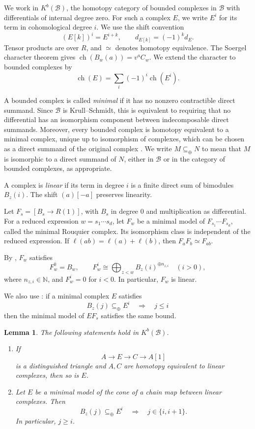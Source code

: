 \documentclass[11pt,a4paper]{article}
\numberwithin{equation}{section}
\newtheorem{lemma}[theorem]{Lemma}
\theoremstyle{remark}
\newcommand{\B}{\mathcal B}
\newcommand{\ch}{\operatorname{ch}}
\newcommand{\summand}{\mathrel{\subseteq_{\oplus}}}
\begin{document}
We work in \(K^b(\mathcal B)\), the homotopy category of bounded complexes in \(\mathcal B\) with differentials of internal degree zero. For such a complex \(E\), we write \(E^i\) for its term in cohomological degree \(i\). We use the shift convention
\[
(E[k])^i=E^{i+k},\qquad d_{E[k]}=(-1)^k d_E.
\]
Tensor products are over $R$, and $\simeq$ denotes homotopy equivalence.
The Soergel character theorem \cite[Theorem 1.1]{EW} gives
$\ch(B_w(a))=v^aC_w$. We extend the character to bounded complexes by
\[
\operatorname{ch}(E)=\sum_i(-1)^i\operatorname{ch}(E^i).
\]

A bounded complex is called \textit{minimal} if it has no nonzero contractible direct summand. Since \(\mathcal B\) is Krull–Schmidt, this is equivalent to requiring that no differential has an isomorphism component between indecomposable direct summands. Moreover, every bounded complex is homotopy equivalent to a minimal complex, unique up to
isomorphism of complexes, which can be chosen as a direct summand of
the original complex \cite[\S6.1]{EW}. We write \(M\summand N\) to mean that \(M\) is isomorphic to a direct summand of \(N\), either in \(\mathcal B\) or in the category of bounded complexes, as appropriate.

A complex is \emph{linear} if its term in degree $i$ is a finite direct
sum of bimodules $B_z(i)$. The shift $(a)[-a]$ preserves linearity.

Let $F_s=[B_s\to R(1)]$, with $B_s$ in degree $0$ and multiplication
as differential. For a reduced expression $w=s_1\cdots s_d$, let
$F_w$ be a minimal model of $F_{s_1}\cdots F_{s_d}$, called the minimal Rouquier complex. Its isomorphism
class is independent of the reduced expression. If
$\ell(ab)=\ell(a)+\ell(b)$, then $F_aF_b\simeq F_{ab}$.


By \cite[Theorem 6.9]{EW}, \(F_w\) satisfies
\[
F_w^0=B_w,\qquad
F_w^i\cong\bigoplus_{z<w}B_z(i)^{\oplus n_{z,i}}
\quad(i>0),
\]
where \(n_{z,i}\in\mathbb N\), and \(F_w^i=0\) for \(i<0\).
In particular, \(F_w\) is linear.

We also use \cite[Lemma 6.6]{EW}: if a minimal complex $E$ satisfies
\begin{equation}\label{eq:upper-condition}
 B_z(j)\summand E^i\quad\Longrightarrow\quad j\le i
\end{equation}
then the minimal model of $EF_s$ satisfies the same bound.


\begin{lemma}\label{lem:cones}
	The following statements hold in $K^b(\B)$.
	\begin{enumerate}
		\item If
		\[
		A\longrightarrow E\longrightarrow C
		\longrightarrow A[1]
		\]
		is a distinguished triangle and $A,C$ are homotopy
		equivalent to linear complexes, then so is $E$.
		
		\item Let $E$ be a minimal model of the cone of a
		chain map between linear complexes. Then
		\[
		B_z(j)\summand E^i
		\quad\Longrightarrow\quad
		j\in\{i,i+1\}.
		\]
		In particular, $j\ge i$.
	\end{enumerate}
\end{lemma}
\end{document}
